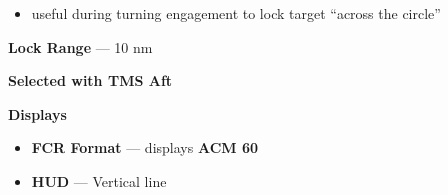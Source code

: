 \begin{tcoloritemize}
{\begin{subitemize}
\begin{itemize}
            \item useful during turning engagement to lock target ``across the circle''
        \end{itemize}
        \item \textbf{Lock Range} --- 10 nm
        \item \textbf{Selected with TMS Aft}
        \item \textbf{Displays}
        \begin{itemize}
            \item \textbf{FCR Format} --- displays \textbf{ACM 60}
            \item \textbf{HUD} --- Vertical line
        \end{itemize}
    \end{subitemize}}
\end{tcoloritemize}

\marginfigeometry

